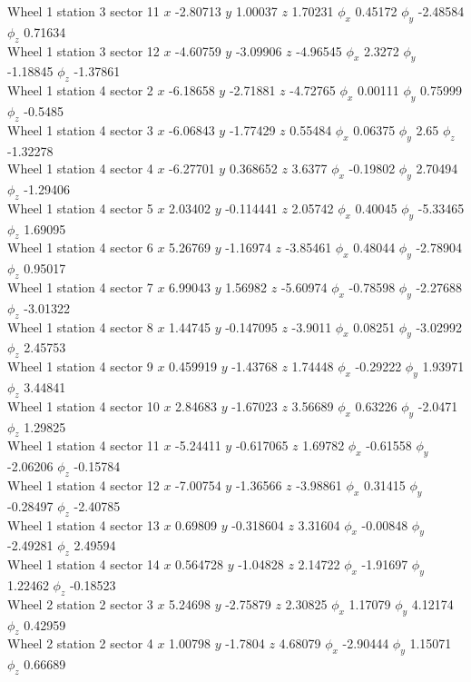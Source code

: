 \documentclass[compress]{beamer}
\begin{document}
\begin{frame}
Wheel 1 station 3 sector 11 $x$ -2.80713 $y$ 1.00037 $z$ 1.70231 $\phi_x$ 0.45172 $\phi_y$ -2.48584 $\phi_z$ 0.71634 \\
Wheel 1 station 3 sector 12 $x$ -4.60759 $y$ -3.09906 $z$ -4.96545 $\phi_x$ 2.3272 $\phi_y$ -1.18845 $\phi_z$ -1.37861 \\
Wheel 1 station 4 sector 2 $x$ -6.18658 $y$ -2.71881 $z$ -4.72765 $\phi_x$ 0.00111 $\phi_y$ 0.75999 $\phi_z$ -0.5485 \\
Wheel 1 station 4 sector 3 $x$ -6.06843 $y$ -1.77429 $z$ 0.55484 $\phi_x$ 0.06375 $\phi_y$ 2.65 $\phi_z$ -1.32278 \\
Wheel 1 station 4 sector 4 $x$ -6.27701 $y$ 0.368652 $z$ 3.6377 $\phi_x$ -0.19802 $\phi_y$ 2.70494 $\phi_z$ -1.29406 \\
Wheel 1 station 4 sector 5 $x$ 2.03402 $y$ -0.114441 $z$ 2.05742 $\phi_x$ 0.40045 $\phi_y$ -5.33465 $\phi_z$ 1.69095 \\
Wheel 1 station 4 sector 6 $x$ 5.26769 $y$ -1.16974 $z$ -3.85461 $\phi_x$ 0.48044 $\phi_y$ -2.78904 $\phi_z$ 0.95017 \\
Wheel 1 station 4 sector 7 $x$ 6.99043 $y$ 1.56982 $z$ -5.60974 $\phi_x$ -0.78598 $\phi_y$ -2.27688 $\phi_z$ -3.01322 \\
Wheel 1 station 4 sector 8 $x$ 1.44745 $y$ -0.147095 $z$ -3.9011 $\phi_x$ 0.08251 $\phi_y$ -3.02992 $\phi_z$ 2.45753 \\
Wheel 1 station 4 sector 9 $x$ 0.459919 $y$ -1.43768 $z$ 1.74448 $\phi_x$ -0.29222 $\phi_y$ 1.93971 $\phi_z$ 3.44841 \\
Wheel 1 station 4 sector 10 $x$ 2.84683 $y$ -1.67023 $z$ 3.56689 $\phi_x$ 0.63226 $\phi_y$ -2.0471 $\phi_z$ 1.29825 \\
Wheel 1 station 4 sector 11 $x$ -5.24411 $y$ -0.617065 $z$ 1.69782 $\phi_x$ -0.61558 $\phi_y$ -2.06206 $\phi_z$ -0.15784 \\
Wheel 1 station 4 sector 12 $x$ -7.00754 $y$ -1.36566 $z$ -3.98861 $\phi_x$ 0.31415 $\phi_y$ -0.28497 $\phi_z$ -2.40785 \\
Wheel 1 station 4 sector 13 $x$ 0.69809 $y$ -0.318604 $z$ 3.31604 $\phi_x$ -0.00848 $\phi_y$ -2.49281 $\phi_z$ 2.49594 \\
Wheel 1 station 4 sector 14 $x$ 0.564728 $y$ -1.04828 $z$ 2.14722 $\phi_x$ -1.91697 $\phi_y$ 1.22462 $\phi_z$ -0.18523 \\
Wheel 2 station 2 sector 3 $x$ 5.24698 $y$ -2.75879 $z$ 2.30825 $\phi_x$ 1.17079 $\phi_y$ 4.12174 $\phi_z$ 0.42959 \\
Wheel 2 station 2 sector 4 $x$ 1.00798 $y$ -1.7804 $z$ 4.68079 $\phi_x$ -2.90444 $\phi_y$ 1.15071 $\phi_z$ 0.66689 \\

\end{frame}
\end{document}
